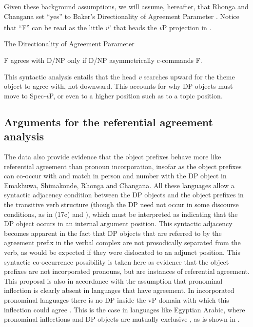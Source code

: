 \documentclass[output=paper]{langsci/langscibook}
\begin{document}
Given these background assumptions, we will assume, hereafter, that Rhonga and Changana set “yes” to Baker’s Directionality of Agreement Parameter . Notice that “F” can be read as the little \textit{v}\textsuperscript{o} that heads the {\textit{v}}P projection in .

\ea\label{ex:nguna:23}
{The Directionality of Agreement Parameter \citep[155]{Baker2008}}

{F agrees with D/NP only if D/NP asymmetrically c-commands F.}
\z

This syntactic analysis entails that the head {\textit{v}} searches upward for the theme object to agree with, not downward. This accounts for why DP objects must move to Spec-{\textit{v}}P, or even to a higher position such as to a topic position.

\subsection{Arguments for the referential agreement analysis}\label{sec:nguna:4.2}

The data also provide evidence that the object prefixes behave more like referential agreement than pronoun incorporation, insofar as the object prefixes can co-occur with and match in person and number with the DP object in Emakhuwa, Shimakonde, Rhonga and Changana. All these languages allow a syntactic adjacency condition between the DP objects and the object prefixes in the transitive verb structure (though the DP need not occur in some discourse conditions, as in (17c) and ), which must be interpreted as indicating that the DP object occurs in an internal argument position. This syntactic adjacency becomes apparent in the fact that DP objects that are referred to by the agreement prefix in the verbal complex are not prosodically separated from the verb, as would be expected if they were dislocated to an adjunct position. This syntactic co-occurrence possibility is taken here as evidence that the object prefixes are not incorporated pronouns, but are instances of referential agreement. This proposal is also in accordance with the assumption that pronominal inflection is clearly absent in languages that have agreement. In incorporated pronominal languages there is no DP inside the vP domain with which this inflection could agree \citep{Jelinek1989}. This is the case in languages like Egyptian Arabic, where pronominal inflections and DP objects are mutually exclusive \citep{Jelinek1989}, as is shown in .
\end{document}
